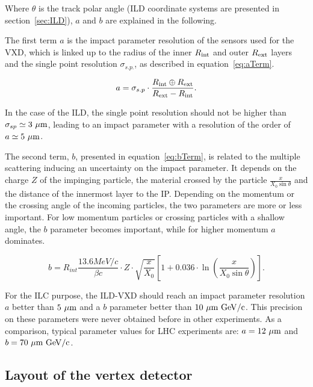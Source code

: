     Where $\theta$ is the track polar angle (\gls{ILD} coordinate systems are presented in section~\ref{sec:ILD}), $a$ and $b$ are explained in the following.

   The first term $a$ is the impact parameter resolution of the sensors used for the \gls{VXD}, which is linked up to the radius of the inner $R_{\rm{int}}$ and outer $R_{\rm{ext}}$ layers and the single point resolution $\sigma_{s.p.}$, as described in equation~\ref{eq:aTerm}.

   \begin{equation}
     a = \sigma_{s.p} \cdot \frac{R_{\rm{int}} \oplus R_{\rm{ext}}}{R_{\rm{ext}} - R_{\rm{int}}}.
     \label{eq:aTerm}
   \end{equation}

    In the case of the \gls{ILD}, the single point resolution should not be higher than $\sigma_{sp} \simeq 3~\rm{\mu m}$, leading to an impact parameter with a resolution of the order of $a \simeq 5~\rm{\mu m}$.
   
    The second term, $b$, presented in equation~\ref{eq:bTerm}, is related to the multiple scattering inducing an uncertainty on the impact parameter.
    It depends on the charge $Z$ of the impinging particle, the material crossed by the particle $\frac{x}{X_0 \sin{\theta}}$ and the distance of the innermost layer to the \gls{IP}.
    Depending on the momentum or the crossing angle of the incoming particles, the two parameters are more or less important.
    For low momentum particles or crossing particles with a shallow angle, the $b$ parameter becomes important, while for higher momentum $a$ dominates.


    \begin{equation}
      b = R_{int} \frac{13.6 MeV/c}{\beta c} \cdot Z \cdot \sqrt{\frac{x}{X_{0}}} \left[ 1 + 0.036 \cdot \ln{ \left( \frac{x}{X_{0}\sin{\theta}} \right)} \right].
      \label{eq:bTerm}
    \end{equation}
   
   For the \gls{ILC} purpose, the \gls{ILD}-\gls{VXD} should reach an impact parameter resolution $a$ better than $5~\rm{\mu m}$ and a $b$ parameter better than $10~\rm{\mu m~GeV/c}$. 
   This precision on these parameters were never obtained before in other experiments.
   As a comparison, typical parameter values for \gls{LHC} experiments are: $a =  12~\rm{\mu m}$ and $b = 70~\rm{\mu m}~\rm{GeV/c}$. 

   \subsection{Layout of the vertex detector}
   \label{subsec:layout}

